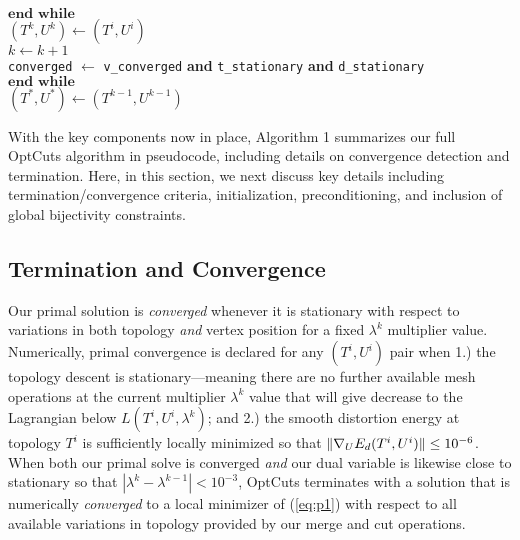 \begin{algorithm}[t]
\hspace{10pt} $\textbf{end while}$ \\

\hspace{10pt}  $(T^{k},U^{k}) \leftarrow (T^{i},U^{i})$ \\

\hspace{10pt} $k \leftarrow k + 1$ \\

\hspace{10pt} \texttt{converged} $\leftarrow$ \texttt{v\_converged} \textbf{and}   \texttt{t\_stationary}  \textbf{and} \texttt{d\_stationary} \\

 $\textbf{end while}$ \\
 
 $(T^{*},U^{*}) \leftarrow (T^{k-1},U^{k-1})$

\end{algorithm}

With the key components now in place, Algorithm 1 summarizes our full OptCuts algorithm in pseudocode, including details on convergence detection and termination. Here, in this section, we next discuss key details including termination/convergence criteria, initialization, preconditioning, and inclusion of global bijectivity constraints.


\subsection{Termination and Convergence}

Our primal solution is \emph{converged} whenever it is stationary with respect to variations in both topology \emph{and} vertex position for a fixed $\lambda^k$ multiplier value. Numerically, primal convergence is declared for any $(T^i,U^i)$ pair when 1.) the topology descent is stationary---meaning there are no further available mesh operations at the current multiplier $\lambda^k$ value that will give decrease to the Lagrangian below $L(T^i,U^i,\lambda^k)$;
and 2.) the smooth distortion energy at topology $T^i$ is sufficiently locally minimized so that $\| \nabla_{\small{U}} E_{d}(T^i,U^i)\| \leq 10^{-6}$. When both our primal solve is converged \emph{and} our dual variable is likewise close to stationary so that $| \lambda^k -  \lambda^{k-1}| < 10^{-3}$, OptCuts terminates with a solution that is numerically \emph{converged} to a local minimizer of (\ref{eq:p1}) with respect to all available variations in topology provided by our merge and cut operations. 

